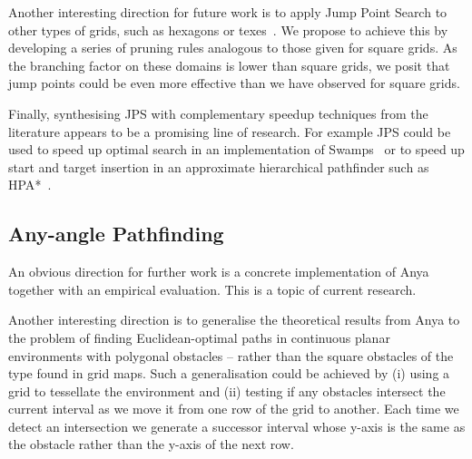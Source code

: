 Another interesting direction for future work is to apply Jump Point Search 
to other types of grids, such as hexagons or texes~\citep{yap02}. We propose
to achieve this by developing  a series of pruning rules analogous to those
given for square grids.  As the branching factor on these domains is lower
than square grids, we posit that jump points could be even more effective 
than we have observed for square grids.

Finally, synthesising JPS with complementary speedup techniques from the
literature appears to be a promising line of research. For example JPS could
be used to speed up optimal search in an implementation of
Swamps~\citep{pochter10} or to speed up start and target insertion in an
approximate hierarchical pathfinder such as HPA{*}~\citep{botea04}.

\subsection{Any-angle Pathfinding}
An obvious direction for further work is a concrete implementation of Anya
together with an empirical evaluation. This is a topic of current research.

Another interesting direction is to generalise the theoretical results from
Anya to the problem of finding Euclidean-optimal paths in continuous planar
environments with polygonal obstacles -- rather than the square obstacles of
the type found in grid maps. Such a generalisation could be achieved by (i) 
using a grid to tessellate the environment and (ii) testing if any obstacles
intersect the current interval as we move it from one row of the grid to another.
Each time we detect an intersection we generate a successor interval whose y-axis
is the same as the obstacle rather than the y-axis of the next row.
